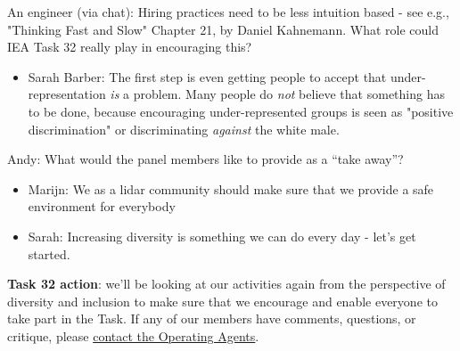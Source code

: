 An engineer (via chat): Hiring practices need to be less intuition based - see e.g., "Thinking Fast and Slow" Chapter 21, by Daniel Kahnemann. What role could IEA Task 32 really play in encouraging this?

\begin{itemize}
	\item Sarah Barber: The first step is even getting people to accept that under-representation \emph{is} a problem. Many people do \emph{not} believe that something has to be done, because encouraging under-represented groups is seen as "positive discrimination" or discriminating \emph{against} the white male.
\end{itemize}

Andy: What would the panel members like to provide as a \enquote{take away}?

\begin{itemize}
	\item Marijn: We as a lidar community should make sure that we provide a safe environment for everybody
	\item Sarah: Increasing diversity is something we can do every day - let's get started.
\end{itemize}


\textbf{Task 32 action}: we'll be looking at our activities again from the perspective of diversity and inclusion to make sure that we encourage and enable everyone to take part in the Task. If any of our members have comments, questions, or critique, please \href{mailto:ieawind.task32@ifb.uni-stuttgart.de}{contact the Operating Agents}.